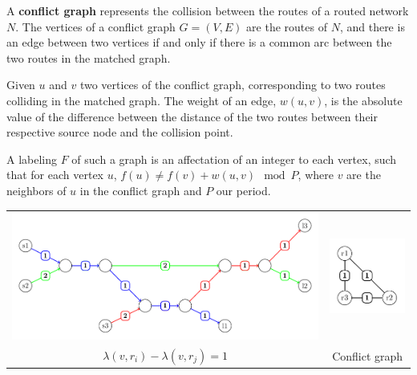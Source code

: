 \documentclass[a4paper,10pt]{report}
\begin{document}

A {\bf conflict graph} represents the collision between the routes of a routed network $N$. The vertices of a conflict graph $G = (V,E)$ are the routes of $N$, and there is an edge between two vertices if and only if there is a common arc between the two routes in the matched graph.
 
 Given $u$ and $v$ two vertices of the conflict graph, corresponding to two routes colliding in the matched graph. The weight of an edge, $w(u,v)$, is the absolute value of the difference between the distance of the two routes between their respective source node and the collision point.
 
 A labeling $F$ of such a graph is an affectation of an integer to each vertex, such that for each vertex $u$, $f(u) \neq f(v)+w(u,v)\mod P$, where $v$ are the neighbors of $u$ in the conflict graph and $P$ our period.
 
\begin{tabular}{cc}
\includegraphics[scale=0.5]{Fig5.pdf} & \includegraphics[scale=1]{Fig7.pdf}\\
 $\lambda(v,r_i) - \lambda(v,r_j)=1$ & Conflict graph\\
\end{tabular}\newline
\end{document}
